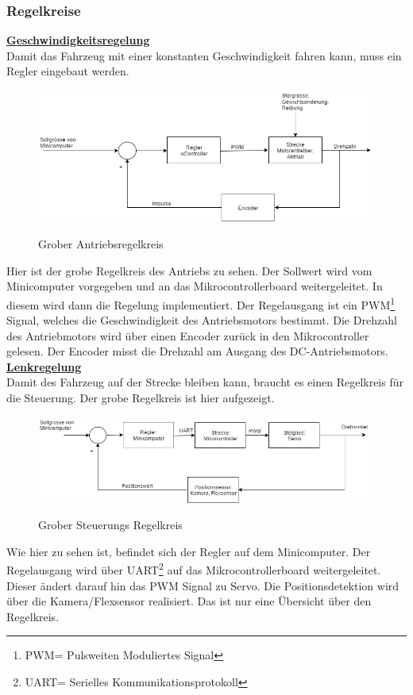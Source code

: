 \subsubsection{Regelkreise}
\underline{\textbf{Geschwindigkeitsregelung}}\\[0.2cm]
Damit das Fahrzeug mit einer konstanten Geschwindigkeit fahren kann, muss ein Regler eingebaut werden.
\begin{figure}[H]
	\centering
	\includegraphics[width=1\textwidth]{03_Loesungskonzept/pictures/Gesch_Regelung.png}
	\label{Regelung_Gesch}
	\caption{Grober Antriebsregelkreis}
\end{figure}\flushleft
Hier ist der grobe Regelkreis des Antriebs zu sehen. Der Sollwert wird vom Minicomputer vorgegeben und an das Mikrocontrollerboard weitergeleitet. In diesem wird dann die Regelung implementiert. Der Regelausgang ist ein PWM\footnote{PWM= Pulsweiten Moduliertes Signal} Signal, welches die Geschwindigkeit des Antriebsmotors bestimmt. Die Drehzahl des Antriebmotors wird über einen Encoder zurück in den Mikrocontroller gelesen. Der Encoder misst die Drehzahl am Ausgang des DC-Antriebsmotors.\\[0.2cm]
\underline{\textbf{Lenkregelung}}\\[0.2cm]
Damit des Fahrzeug auf der Strecke bleiben kann, braucht es einen Regelkreis für die Steuerung. Der grobe Regelkreis ist hier aufgezeigt.
\begin{figure}[H]
	\centering
	\includegraphics[width=1\textwidth]{03_Loesungskonzept/pictures/Lenk_Regelung.png}
	\label{Regelung_Lenken}
	\caption{Grober Steuerungs Regelkreis }
\end{figure}\flushleft
Wie hier zu sehen ist, befindet sich der Regler auf dem Minicomputer. Der Regelausgang wird über UART\footnote{UART= Serielles Kommunikationsprotokoll} auf das Mikrocontrollerboard weitergeleitet. Dieser ändert darauf hin das PWM Signal zu Servo. Die Positionsdetektion wird über die Kamera/Flexsensor realisiert. Das ist nur eine Übersicht über den Regelkreis.
